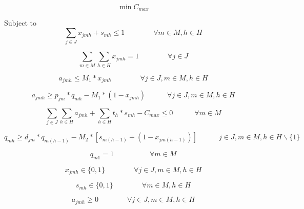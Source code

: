 \documentclass[a4paper,11pt]{article}
\begin{document}
\begin{equation}\label{eq:fo_mod2}
	\min C_{max}
\end{equation}

Subject to
\begin{equation}\label{eq:uniqueAct_mod2}	
 \sum_{j \in J}{x_{jmh}} +  s_{mh} \leq 1 \quad\quad\quad\quad \forall m \in M, h \in H 
\end{equation}

\begin{equation}\label{eq:mandJob_mod2}
	\sum_{m \in M}\sum_{h \in H}{x_{jmh}} = 1 \quad\quad\quad\quad \forall j \in J
\end{equation}

\begin{equation}\label{eq:procTime1_mod2}
	a_{jmh} \leq M_1*x_{jmh} \quad \quad \quad \quad \forall j \in J, m \in M, h \in H
\end{equation}

\begin{equation}\label{eq:procTime2_mod2}
	a_{jmh} \geq p_{jm}*q_{mh} - M_1*(1-x_{jmh}) \quad \quad \quad \forall j \in J, m \in M, h \in H
\end{equation}

\begin{equation}\label{eq:cMax_mod2}
	\sum_{j \in J}\sum_{h \in H} a_{jmh} + \sum_{h \in H} t_h*s_{mh} - C_{max} \leq 0 \quad \quad \quad \forall m \in M
\end{equation}

\begin{equation}\label{eq:det_mod2}
q_{mh} \geq d_{jm}*q_{m(h-1)} - M_2*[s_{m(h-1)}+(1-x_{jm(h-1)})]    \quad \quad \quad j \in J, m \in M, h \in H\backslash\{1\}
\end{equation}

\begin{equation}\label{eq:qInit_mod2}
q_{m1} = 1 \quad\quad\quad\quad\quad \forall m \in M
\end{equation}

\begin{equation}\label{eq:xDef_mod2}
    x_{jmh} \in \{0,1\} \quad \quad \quad \quad \forall j \in J, m \in M, h \in H
\end{equation}

\begin{equation}\label{eq:dDef_mod2}
    s_{mh} \in \{0,1\} \quad \quad \quad \quad \forall m \in M, h \in H
\end{equation}

\begin{equation}\label{eq:aDef_mod2}
    a_{jmh} \geq 0 \quad \quad \quad \quad \forall j \in J, m \in M, h \in H
\end{equation}
\end{document}
